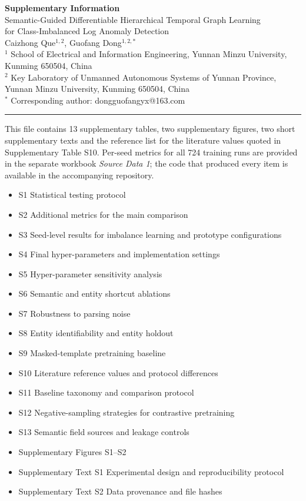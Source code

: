 \documentclass[11pt,a4paper]{article}
\begin{document}
\begin{center}
{\Large\bfseries Supplementary Information}\\[6pt]
{\large Semantic-Guided Differentiable Hierarchical Temporal Graph Learning\\
for Class-Imbalanced Log Anomaly Detection}\\[8pt]
Caizhong Que$^{1,2}$, Guofang Dong$^{1,2,*}$\\[4pt]
{\small $^1$ School of Electrical and Information Engineering, Yunnan Minzu University,
Kunming 650504, China\\
$^2$ Key Laboratory of Unmanned Autonomous Systems of Yunnan Province,
Yunnan Minzu University, Kunming 650504, China\\
$^*$ Corresponding author: dongguofangyx@163.com}
\end{center}

\vspace{-4pt}
\hrule
\vspace{6pt}

\noindent This file contains 13 supplementary tables, two supplementary figures, two
short supplementary texts and the reference list for the literature values quoted in
Supplementary Table S10. Per-seed metrics for all 724 training runs are provided in the
separate workbook \emph{Source Data 1}; the code that produced every item is available
in the accompanying repository.

\begin{itemize}
\item S1 Statistical testing protocol
\item S2 Additional metrics for the main comparison
\item S3 Seed-level results for imbalance learning and prototype configurations
\item S4 Final hyper-parameters and implementation settings
\item S5 Hyper-parameter sensitivity analysis
\item S6 Semantic and entity shortcut ablations
\item S7 Robustness to parsing noise
\item S8 Entity identifiability and entity holdout
\item S9 Masked-template pretraining baseline
\item S10 Literature reference values and protocol differences
\item S11 Baseline taxonomy and comparison protocol
\item S12 Negative-sampling strategies for contrastive pretraining
\item S13 Semantic field sources and leakage controls
\item Supplementary Figures S1--S2
\item Supplementary Text S1 Experimental design and reproducibility protocol
\item Supplementary Text S2 Data provenance and file hashes
\end{itemize}
\end{document}
